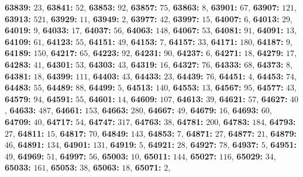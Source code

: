 \textsf{\bfseries 63839:} $23$, \textsf{\bfseries 63841:} $52$, \textsf{\bfseries 63853:} $92$, \textsf{\bfseries 63857:} $75$, \textsf{\bfseries 63863:} $8$, \textsf{\bfseries 63901:} $67$, \textsf{\bfseries 63907:} $121$, \textsf{\bfseries 63913:} $521$, \textsf{\bfseries 63929:} $11$, \textsf{\bfseries 63949:} $2$, \textsf{\bfseries 63977:} $42$, \textsf{\bfseries 63997:} $15$, \textsf{\bfseries 64007:} $6$, \textsf{\bfseries 64013:} $29$, \textsf{\bfseries 64019:} $9$, \textsf{\bfseries 64033:} $17$, \textsf{\bfseries 64037:} $56$, \textsf{\bfseries 64063:} $148$, \textsf{\bfseries 64067:} $53$, \textsf{\bfseries 64081:} $91$, \textsf{\bfseries 64091:} $13$, \textsf{\bfseries 64109:} $61$, \textsf{\bfseries 64123:} $55$, \textsf{\bfseries 64151:} $49$, \textsf{\bfseries 64153:} $7$, \textsf{\bfseries 64157:} $33$, \textsf{\bfseries 64171:} $180$, \textsf{\bfseries 64187:} $9$, \textsf{\bfseries 64189:} $150$, \textsf{\bfseries 64217:} $65$, \textsf{\bfseries 64223:} $92$, \textsf{\bfseries 64231:} $90$, \textsf{\bfseries 64237:} $6$, \textsf{\bfseries 64271:} $18$, \textsf{\bfseries 64279:} $17$, \textsf{\bfseries 64283:} $41$, \textsf{\bfseries 64301:} $53$, \textsf{\bfseries 64303:} $43$, \textsf{\bfseries 64319:} $16$, \textsf{\bfseries 64327:} $76$, \textsf{\bfseries 64333:} $68$, \textsf{\bfseries 64373:} $8$, \textsf{\bfseries 64381:} $18$, \textsf{\bfseries 64399:} $111$, \textsf{\bfseries 64403:} $43$, \textsf{\bfseries 64433:} $23$, \textsf{\bfseries 64439:} $76$, \textsf{\bfseries 64451:} $4$, \textsf{\bfseries 64453:} $74$, \textsf{\bfseries 64483:} $55$, \textsf{\bfseries 64489:} $88$, \textsf{\bfseries 64499:} $5$, \textsf{\bfseries 64513:} $140$, \textsf{\bfseries 64553:} $13$, \textsf{\bfseries 64567:} $95$, \textsf{\bfseries 64577:} $43$, \textsf{\bfseries 64579:} $94$, \textsf{\bfseries 64591:} $55$, \textsf{\bfseries 64601:} $14$, \textsf{\bfseries 64609:} $107$, \textsf{\bfseries 64613:} $39$, \textsf{\bfseries 64621:} $57$, \textsf{\bfseries 64627:} $40$, \textsf{\bfseries 64633:} $487$, \textsf{\bfseries 64661:} $153$, \textsf{\bfseries 64663:} $280$, \textsf{\bfseries 64667:} $49$, \textsf{\bfseries 64679:} $16$, \textsf{\bfseries 64693:} $60$, \textsf{\bfseries 64709:} $40$, \textsf{\bfseries 64717:} $54$, \textsf{\bfseries 64747:} $317$, \textsf{\bfseries 64763:} $38$, \textsf{\bfseries 64781:} $200$, \textsf{\bfseries 64783:} $184$, \textsf{\bfseries 64793:} $27$, \textsf{\bfseries 64811:} $15$, \textsf{\bfseries 64817:} $70$, \textsf{\bfseries 64849:} $143$, \textsf{\bfseries 64853:} $7$, \textsf{\bfseries 64871:} $27$, \textsf{\bfseries 64877:} $21$, \textsf{\bfseries 64879:} $46$, \textsf{\bfseries 64891:} $134$, \textsf{\bfseries 64901:} $131$, \textsf{\bfseries 64919:} $5$, \textsf{\bfseries 64921:} $28$, \textsf{\bfseries 64927:} $78$, \textsf{\bfseries 64937:} $5$, \textsf{\bfseries 64951:} $49$, \textsf{\bfseries 64969:} $51$, \textsf{\bfseries 64997:} $56$, \textsf{\bfseries 65003:} $10$, \textsf{\bfseries 65011:} $144$, \textsf{\bfseries 65027:} $116$, \textsf{\bfseries 65029:} $34$, \textsf{\bfseries 65033:} $161$, \textsf{\bfseries 65053:} $38$, \textsf{\bfseries 65063:} $18$, \textsf{\bfseries 65071:} $2$, 
